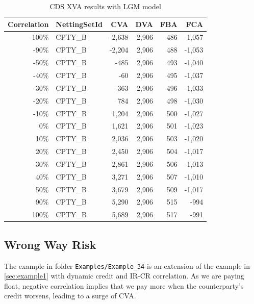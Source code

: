 \documentclass[12pt, a4paper]{article}
\begin{document}
{\begin{table}[hbt]
\scriptsize
\begin{center}
\begin{tabular}{|r|l|r|r|r|r|}
\hline
Correlation & NettingSetId & CVA & DVA & FBA & FCA \\
\hline
-100\%  &  CPTY\_B  &  -2,638  &  2,906  &  486  &  -1,057 \\
 -90\%  &  CPTY\_B  &  -2,204  &  2,906  &  488  &  -1,053 \\
 -50\%  &  CPTY\_B  &    -485  &  2,906  &  493  &  -1,040 \\
 -40\%  &  CPTY\_B  &     -60  &  2,906  &  495  &  -1,037 \\
 -30\%  &  CPTY\_B  &     363  &  2,906  &  496  &  -1,033 \\
 -20\%  &  CPTY\_B  &     784  &  2,906  &  498  &  -1,030 \\
 -10\%  &  CPTY\_B  &   1,204  &  2,906  &  500  &  -1,027 \\
   0\%  &  CPTY\_B  &   1,621  &  2,906  &  501  &  -1,023 \\
  10\%  &  CPTY\_B  &   2,036  &  2,906  &  503  &  -1,020 \\
  20\%  &  CPTY\_B  &   2,450  &  2,906  &  504  &  -1,017 \\
  30\%  &  CPTY\_B  &   2,861  &  2,906  &  506  &  -1,013 \\
  40\%  &  CPTY\_B  &   3,271  &  2,906  &  507  &  -1,010 \\
  50\%  &  CPTY\_B  &   3,679  &  2,906  &  509  &  -1,017 \\
  90\%  &  CPTY\_B  &   5,290  &  2,906  &  515  &    -994 \\
 100\%  &  CPTY\_B  &   5,689  &  2,906  &  517  &    -991 \\
\hline
\end{tabular}
\caption{CDS XVA results with LGM model}
\end{center}
\end{table}

\subsection{Wrong Way Risk}%
\label{example:34}

The example in folder {\tt Examples/Example\_34} is an extension of the example in
\ref{sec:example1} with dynamic credit and IR-CR correlation. As we are paying
float, negative correlation implies that we pay more when the counterparty's credit
worsens, leading to a surge of CVA.

}
\end{document}
